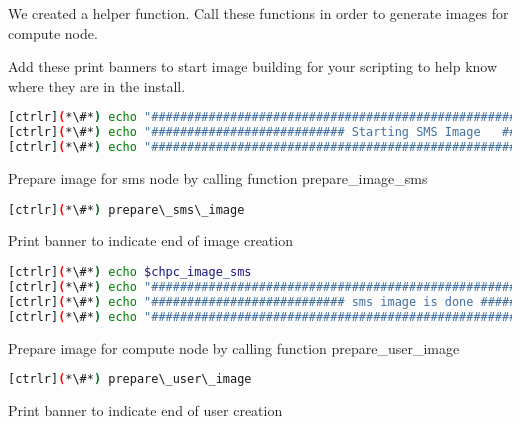 	We created a helper function. Call these functions in order to generate images for compute node.


	Add these print banners to start image building for your scripting to help know where they are in the install.

\begin{lstlisting}[language=bash,keywords={},upquote=true]
[ctrlr](*\#*) echo "########################################################################"
[ctrlr](*\#*) echo "########################### Starting SMS Image   ###########################"
[ctrlr](*\#*) echo "########################################################################"
\end{lstlisting}

	Prepare image for sms node by calling function prepare\_image\_sms

\begin{lstlisting}[language=bash,keywords={},upquote=true]
[ctrlr](*\#*) prepare\_sms\_image
\end{lstlisting}


	Print banner to indicate end of image creation

\begin{lstlisting}[language=bash,keywords={},upquote=true]
[ctrlr](*\#*) echo $chpc_image_sms
[ctrlr](*\#*) echo "########################################################################"
[ctrlr](*\#*) echo "########################### sms image is done ##########################"
[ctrlr](*\#*) echo "########################################################################"
\end{lstlisting}
	Prepare image for compute node by calling function prepare\_user\_image

\begin{lstlisting}[language=bash,keywords={},upquote=true]
[ctrlr](*\#*) prepare\_user\_image
\end{lstlisting}

	Print banner to indicate end of user creation
	
